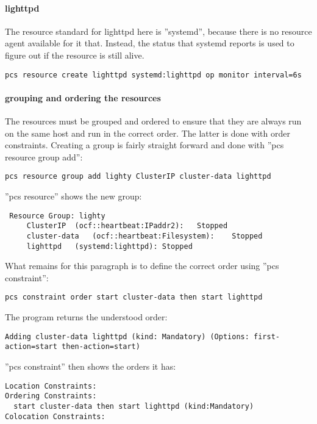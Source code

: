 \paragraph{lighttpd}
The resource standard for lighttpd here is ''systemd'', because there is no resource
agent available for it that. Instead, the status that systemd reports is used to figure
out if the resource is still alive.
\begin{lstlisting}
pcs resource create lighttpd systemd:lighttpd op monitor interval=6s
\end{lstlisting}
\paragraph{grouping and ordering the resources}
The resources must be grouped and ordered to ensure that they are always
run on the same host and run in the correct order. The latter is done with order
constraints.
Creating a group is fairly straight forward and done with ''pcs resource group add'':
\begin{lstlisting}
pcs resource group add lighty ClusterIP cluster-data lighttpd
\end{lstlisting}
''pcs resource'' shows the new group:
\begin{lstlisting}
 Resource Group: lighty
     ClusterIP	(ocf::heartbeat:IPaddr2):	Stopped 
     cluster-data	(ocf::heartbeat:Filesystem):	Stopped 
     lighttpd	(systemd:lighttpd):	Stopped 
\end{lstlisting}
What remains for this paragraph is to define the correct order using ''pcs constraint'':
\begin{lstlisting}
pcs constraint order start cluster-data then start lighttpd
\end{lstlisting}
The program returns the understood order:
\begin{lstlisting}
Adding cluster-data lighttpd (kind: Mandatory) (Options: first-action=start then-action=start)
\end{lstlisting}
''pcs constraint'' then shows the orders it has:
\begin{lstlisting}
Location Constraints:
Ordering Constraints:
  start cluster-data then start lighttpd (kind:Mandatory)
Colocation Constraints:
\end{lstlisting}
